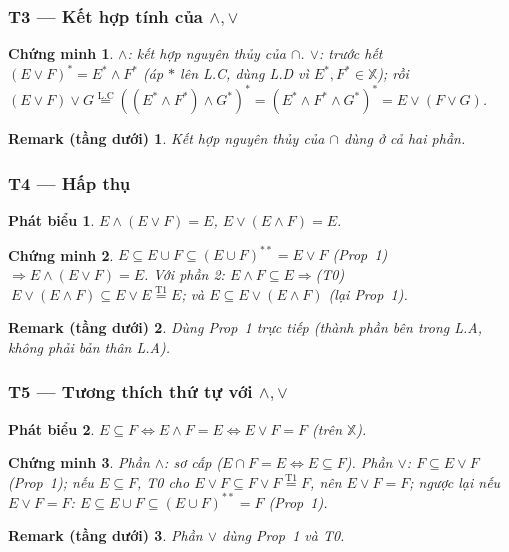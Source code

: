 \documentclass[11pt]{article}
\theoremstyle{plainlabel}
\newtheorem*{phatbieu}{Phát biểu}
\newtheorem*{chungminh}{Chứng minh}
\newtheorem*{remarkbox}{Remark (tầng dưới)}
\begin{document}
\subsubsection*{T3 --- Kết hợp tính của $\wedge,\vee$}
\begin{chungminh} $\wedge$: kết hợp nguyên thủy của $\cap$. $\vee$: trước hết $(E\vee F)^*=E^*\wedge F^*$ (áp $*$ lên L.C, dùng L.D vì $E^*,F^*\in\mathbb X$); rồi $(E\vee F)\vee G\overset{\text{L.C}}=((E^*\wedge F^*)\wedge G^*)^*=(E^*\wedge F^*\wedge G^*)^*=E\vee(F\vee G)$. \end{chungminh}
\begin{remarkbox} Kết hợp nguyên thủy của $\cap$ dùng ở cả hai phần. \end{remarkbox}

\subsubsection*{T4 --- Hấp thụ}
\begin{phatbieu} $E\wedge(E\vee F)=E$, $E\vee(E\wedge F)=E$. \end{phatbieu}
\begin{chungminh} $E\subseteq E\cup F\subseteq(E\cup F)^{**}=E\vee F$ (Prop~1) $\Rightarrow E\wedge(E\vee F)=E$. Với phần 2: $E\wedge F\subseteq E\Rightarrow$(T0)$\ E\vee(E\wedge F)\subseteq E\vee E\overset{\text{T1}}=E$; và $E\subseteq E\vee(E\wedge F)$ (lại Prop~1). \end{chungminh}
\begin{remarkbox} Dùng Prop~1 trực tiếp (thành phần bên trong L.A, không phải bản thân L.A). \end{remarkbox}

\subsubsection*{T5 --- Tương thích thứ tự với $\wedge,\vee$}
\begin{phatbieu} $E\subseteq F\iff E\wedge F=E\iff E\vee F=F$ (trên $\mathbb X$). \end{phatbieu}
\begin{chungminh} Phần $\wedge$: sơ cấp ($E\cap F=E\iff E\subseteq F$). Phần $\vee$: $F\subseteq E\vee F$ (Prop~1); nếu $E\subseteq F$, T0 cho $E\vee F\subseteq F\vee F\overset{\text{T1}}=F$, nên $E\vee F=F$; ngược lại nếu $E\vee F=F$: $E\subseteq E\cup F\subseteq(E\cup F)^{**}=F$ (Prop~1). \end{chungminh}
\begin{remarkbox} Phần $\vee$ dùng Prop~1 và T0. \end{remarkbox}
\end{document}
